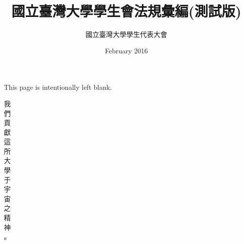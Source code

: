\documentclass[9pt,a4paper]{article}
\title{\huge 國立臺灣大學學生會法規彙編(測試版)} %
\author{國立臺灣大學學生代表大會} %
\date{February 2016} %
\begin{document}
\clearpage

\maketitle %

\newpage
\vspace*{\fill}
\begin{center}
This page is intentionally left blank.
\end{center}
\vspace*{\fill}

\newpage

\vspace*{\fill}
\begin{center}
\huge 我\\們\\貢\\獻\\這\\所\\大\\學\\于\\宇\\宙\\之\\精\\神\\。
\end{center}
\vspace*{\fill}

\newpage
\tableofcontents{}
\end{document}
